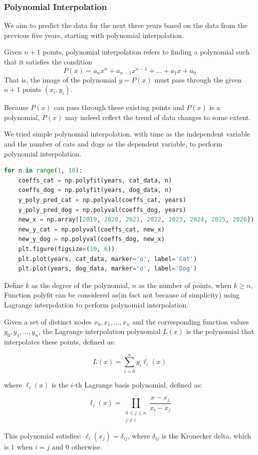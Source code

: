 \documentclass[withoutpreface,bwprint]{cumcmthesis} %
\begin{document}
\subsubsection{Polynomial Interpolation}
\par We aim to predict the data for the next three years based on the data from the previous five years, starting with polynomial interpolation.
\begin{definition}
Given \( n+1 \) points, polynomial interpolation refers to finding a polynomial such that it satisfies the condition
\[
    P(x) = a_n x^n + a_{n-1} x^{n-1} + \dots + a_1 x + a_0
\]
That is, the image of the polynomial \( y = P(x) \) must pass through the given \( n+1 \) points \( (x_i, y_i) \).
\end{definition}
\par Because \( P(x) \) can pass through these existing points and \( P(x) \) is a polynomial, \( P(x) \) may indeed reflect the trend of data changes to some extent.
\par We tried simple polynomial interpolation, with time as the independent variable and the number of cats and dogs as the dependent variable, to perform polynomial interpolation.
\begin{lstlisting}[language=python]
for n in range(1, 10):
    coeffs_cat = np.polyfit(years, cat_data, n)
    coeffs_dog = np.polyfit(years, dog_data, n)
    y_poly_pred_cat = np.polyval(coeffs_cat, years)
    y_poly_pred_dog = np.polyval(coeffs_dog, years)
    new_x = np.array([2019, 2020, 2021, 2022, 2023, 2024, 2025, 2026])
    new_y_cat = np.polyval(coeffs_cat, new_x)
    new_y_dog = np.polyval(coeffs_dog, new_x)
    plt.figure(figsize=(10, 6))
    plt.plot(years, cat_data, marker='o', label='Cat')
    plt.plot(years, dog_data, marker='o', label='Dog')
\end{lstlisting}
\par Define \( k \) as the degree of the polynomial, \( n \) as the number of points, when \( k \geqslant  n \), Function polyfit can be considered as(in fact not because of simplicity) using Lagrange interpolation to perform polynomial interpolation.
\begin{definition}
    Given a set of distinct nodes \( x_0, x_1, \dots, x_n \) and the corresponding function values \( y_0, y_1, \dots, y_n \), the Lagrange interpolation polynomial \( L(x) \) is the polynomial that interpolates these points, defined as:

    \[
    L(x) = \sum_{i=0}^{n} y_i \ell_i(x)
    \]
    
    where \( \ell_i(x) \) is the \( i \)-th Lagrange basis polynomial, defined as:
    
    \[
    \ell_i(x) = \prod_{\substack{0 \leq j \leq n \\ j \neq i}} \frac{x - x_j}{x_i - x_j}
    \]
    
    This polynomial satisfies: \( \ell_i(x_j) = \delta_{ij} \), where \( \delta_{ij} \) is the Kronecker delta, which is 1 when \( i = j \) and 0 otherwise.
    
\end{definition}
\end{document}
